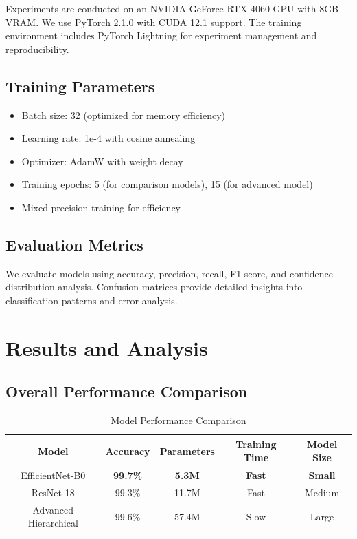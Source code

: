 \documentclass[conference]{IEEEtran}
\begin{document}
Experiments are conducted on an NVIDIA GeForce RTX 4060 GPU with 8GB VRAM. We use PyTorch 2.1.0 with CUDA 12.1 support. The training environment includes PyTorch Lightning for experiment management and reproducibility.

\subsection{Training Parameters}

\begin{itemize}
    \item Batch size: 32 (optimized for memory efficiency)
    \item Learning rate: 1e-4 with cosine annealing
    \item Optimizer: AdamW with weight decay
    \item Training epochs: 5 (for comparison models), 15 (for advanced model)
    \item Mixed precision training for efficiency
\end{itemize}

\subsection{Evaluation Metrics}

We evaluate models using accuracy, precision, recall, F1-score, and confidence distribution analysis. Confusion matrices provide detailed insights into classification patterns and error analysis.

\section{Results and Analysis}

\subsection{Overall Performance Comparison}

\begin{table}[htbp]
\caption{Model Performance Comparison}
\label{tab:performance}
\begin{center}
\begin{tabular}{|c|c|c|c|c|}
\hline
\textbf{Model} & \textbf{Accuracy} & \textbf{Parameters} & \textbf{Training Time} & \textbf{Model Size} \\
\hline
EfficientNet-B0 & \textbf{99.7\%} & \textbf{5.3M} & \textbf{Fast} & \textbf{Small} \\
\hline
ResNet-18 & 99.3\% & 11.7M & Fast & Medium \\
\hline
Advanced Hierarchical & 99.6\% & 57.4M & Slow & Large \\
\hline
\end{tabular}
\end{center}
\end{table}
\end{document}
